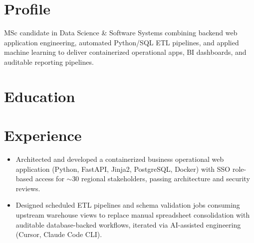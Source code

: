 

\section*{Profile}
MSc candidate in Data Science \& Software Systems combining backend web application engineering, automated Python/SQL ETL pipelines, and applied machine learning to deliver containerized operational apps, BI dashboards, and auditable reporting pipelines.

\section*{Education}


\section*{Experience}
\begin{itemize}\setlength{\itemsep}{0.08em}\setlength{\parskip}{0pt}\setlength{\topsep}{0.1em}
  \item Architected and developed a containerized business operational web application (Python, FastAPI, Jinja2, PostgreSQL, Docker) with SSO role-based access for $\sim$30 regional stakeholders, passing architecture and security reviews.
  \item Designed scheduled ETL pipelines and schema validation jobs consuming upstream warehouse views to replace manual spreadsheet consolidation with auditable database-backed workflows, iterated via AI-assisted engineering (Cursor, Claude Code CLI).
\end{itemize}

